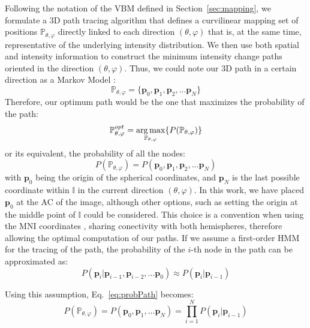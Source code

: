 Following the notation of the \ac{VBM} defined in Section~\ref{sec:mapping}, we formulate a 3D path tracing algorithm that defines a curvilinear mapping set of positions $\mathbb{P}_{\theta,\varphi}$ directly linked to each direction $(\theta,\varphi)$ that is, at the same time, representative of the underlying intensity distribution. We then use both spatial and intensity information to construct the minimum intensity change paths oriented in the direction $(\theta,\varphi)$. Thus, we could note our 3D path in a certain direction as a Markov Model \cite{Chen2008}: 
\begin{equation}
\mathbb{P}_{\theta,\varphi} = \{\mathbf{p}_0, \mathbf{p}_1, \mathbf{p}_2, \dots \mathbf{p}_N\}
\end{equation}
Therefore, our optimum path would be the one that maximizes the probability of the path:
\begin{equation}\label{eq:optimalPath}
\mathbb{P}_{\theta,\varphi}^{opt} = \operatorname*{arg\,max}_{\mathbb{P}_{\theta,\varphi}} \{P(\mathbb{P}_{\theta,\varphi})\}
\end{equation}
or its equivalent, the probability of all the nodes:
\begin{equation}\label{eq:probPath}
P(\mathbb{P}_{\theta,\varphi}) = P(\mathbf{p}_0, \mathbf{p}_1, \mathbf{p}_2, \dots \mathbf{p}_N)
\end{equation}
with $\mathbf{p}_0$ being the origin of the spherical coordinates, and $\mathbf{p}_N$ is the last possible coordinate within $\mathbb{I}$ in the current direction $(\theta,\varphi)$. In this work, we have placed $\mathbf{p}_0$ at the \ac{AC} of the image, although other options, such as setting the origin at the middle point of $\mathbb{I}$ could be considered. This choice is a convention when using the \ac{MNI} coordinates \cite{Evans1993}, sharing conectivity with both hemispheres, therefore allowing the optimal computation of our paths. If we assume a first-order \acf{HMM} for the tracing of the path, the probability of the $i$-th node in the path can be approximated as:
\begin{equation}
P(\mathbf{p}_i | \mathbf{p}_{i-1}, \mathbf{p}_{i-2}, \dots \mathbf{p}_0) \approx P(\mathbf{p}_i|\mathbf{p}_{i-1})
\end{equation}

Using this assumption, Eq.~\ref{eq:probPath} becomes:
\begin{equation}
P(\mathbb{P}_{\theta,\varphi}) = P(\mathbf{p}_0, \mathbf{p}_1, \dots \mathbf{p}_N) = \prod_{i=1}^{N} P(\mathbf{p}_i|\mathbf{p}_{i-1})
\end{equation} 

